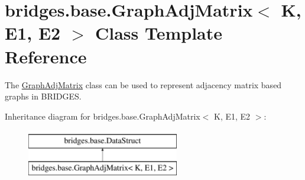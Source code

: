 \hypertarget{classbridges_1_1base_1_1_graph_adj_matrix}{}\section{bridges.\+base.\+Graph\+Adj\+Matrix$<$ K, E1, E2 $>$ Class Template Reference}
\label{classbridges_1_1base_1_1_graph_adj_matrix}


The \hyperlink{classbridges_1_1base_1_1_graph_adj_matrix}{Graph\+Adj\+Matrix} class can be used to represent adjacency matrix based graphs in B\+R\+I\+D\+G\+E\+S.  


Inheritance diagram for bridges.\+base.\+Graph\+Adj\+Matrix$<$ K, E1, E2 $>$\+:\begin{figure}[H]
\begin{center}
\leavevmode
\includegraphics[height=2.000000cm]{classbridges_1_1base_1_1_graph_adj_matrix}
\end{center}
\end{figure}
